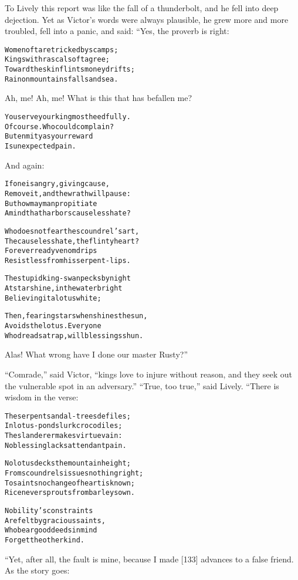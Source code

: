 \documentclass{article}
\renewenvironment{verbatim}{\begin{alltt}\normalfont\begin{centering}}{\end{centering}\end{alltt}}
\begin{document}
To Lively this report was like the fall of a thunderbolt, and he
fell into deep dejection. Yet as Victor's words were always
plausible, he grew more and more troubled, fell into a panic, and
said: “Yes, the proverb is right:

\begin{verbatim}
Women oft are tricked by scamps;
    Kings with rascals oft agree;
Toward the skinflints money drifts;
    Rain on mountains falls and sea.
\end{verbatim}
Ah, me! Ah, me! What is this that has befallen me?

\begin{verbatim}
You serve your king most heedfully.
    Of course. Who could complain?
But enmity as your reward
    Is unexpected pain.
\end{verbatim}
And again:

\begin{verbatim}
If one is angry, giving cause,
Remove it, and the wrath will pause:
But how may man propitiate
A mind that harbors causeless hate?

Who does not fear the scoundrel's art,
The causeless hate, the flinty heart?
For ever ready venom drips
Resistless from his serpent-lips.

The stupid king-swan pecks by night
At starshine, in the water bright
Believing it a lotus white;

Then, fearing stars when shines the sun,
Avoids the lotus. Everyone
Who dreads a trap, will blessings shun.
\end{verbatim}
Alas! What wrong have I done our master Rusty?”

``Comrade,'' said Victor,
``kings love to injure without reason, and they seek out the vulnerable spot in an adversary.''
``True, too true,'' said Lively. “There is wisdom in the verse:

\begin{verbatim}
The serpent sandal-trees defiles;
In lotus-ponds lurk crocodiles;
The slanderer makes virtue vain:
No blessing lacks attendant pain.

No lotus decks the mountain height;
From scoundrels issues nothing right;
To saints no change of heart is known;
Rice never sprouts from barley sown.

Nobility's constraints
Are felt by gracious saints,
Who bear good deeds in mind
Forget the other kind.
\end{verbatim}
“Yet, after all, the fault is mine, because I made [133] advances
to a false friend. As the story goes:
\end{document}
